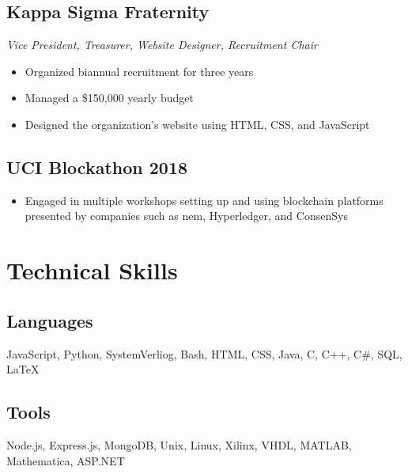 \documentclass[10pt]{article}
\begin{document}
\subsection{Kappa Sigma Fraternity}

\noindent\textit{Vice President, Treasurer, Website Designer, Recruitment Chair}

\begin{itemize}
	\setlength\itemsep{0em}
	\item Organized biannual recruitment for three years
	\item Managed a \$150,000 yearly budget
	\item Designed the organization's website using HTML, CSS, and JavaScript
\end{itemize}

\subsection{UCI Blockathon 2018}

\begin{itemize}
	\setlength\itemsep{0em}
	\item Engaged in multiple workshops setting up and using blockchain platforms presented by companies such as nem, 
Hyperledger, and ConsenSys
\end{itemize}

\section{Technical Skills}

\subsection{Languages}

JavaScript, Python, SystemVerliog, Bash, HTML, CSS, Java, C, C++, C\#, SQL, \LaTeX

\subsection{Tools}

Node.js, Express.js, MongoDB, Unix, Linux, Xilinx, VHDL, MATLAB, Mathematica, ASP.NET
\end{document}
